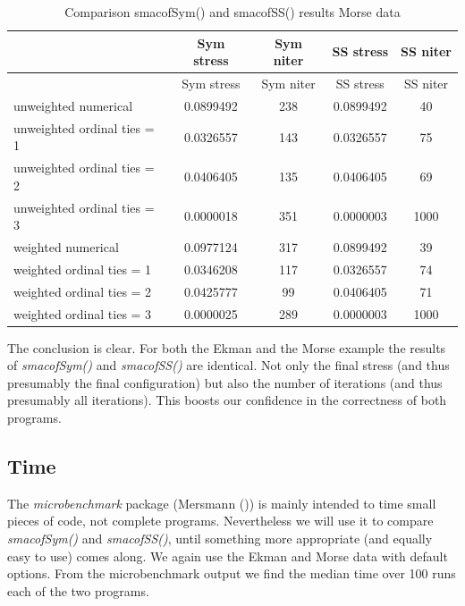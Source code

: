 \documentclass[
  12pt,
  letterpaper,
  DIV=11,
  numbers=noendperiod]{scrartcl}
\begin{document}
\begin{longtable}[]{@{}lcccc@{}}
\caption{Comparison smacofSym() and smacofSS() results Morse
data}\tabularnewline
\toprule\noalign{}
& Sym stress & Sym niter & SS stress & SS niter \\
\midrule\noalign{}
\endfirsthead
\toprule\noalign{}
& Sym stress & Sym niter & SS stress & SS niter \\
\midrule\noalign{}
\endhead
\bottomrule\noalign{}
\endlastfoot
unweighted numerical & 0.0899492 & 238 & 0.0899492 & 40 \\
unweighted ordinal ties = 1 & 0.0326557 & 143 & 0.0326557 & 75 \\
unweighted ordinal ties = 2 & 0.0406405 & 135 & 0.0406405 & 69 \\
unweighted ordinal ties = 3 & 0.0000018 & 351 & 0.0000003 & 1000 \\
weighted numerical & 0.0977124 & 317 & 0.0899492 & 39 \\
weighted ordinal ties = 1 & 0.0346208 & 117 & 0.0326557 & 74 \\
weighted ordinal ties = 2 & 0.0425777 & 99 & 0.0406405 & 71 \\
weighted ordinal ties = 3 & 0.0000025 & 289 & 0.0000003 & 1000 \\
\end{longtable}

The conclusion is clear. For both the Ekman and the Morse example the
results of \emph{smacofSym()} and \emph{smacofSS()} are identical. Not
only the final stress (and thus presumably the final configuration) but
also the number of iterations (and thus presumably all iterations). This
boosts our confidence in the correctness of both programs.

\subsection{Time}\label{time}

The \emph{microbenchmark} package (Mersmann
()) is mainly intended to time small
pieces of code, not complete programs. Nevertheless we will use it to
compare \emph{smacofSym()} and \emph{smacofSS()}, until something more
appropriate (and equally easy to use) comes along. We again use the
Ekman and Morse data with default options. From the microbenchmark
output we find the median time over 100 runs each of the two programs.
\end{document}
